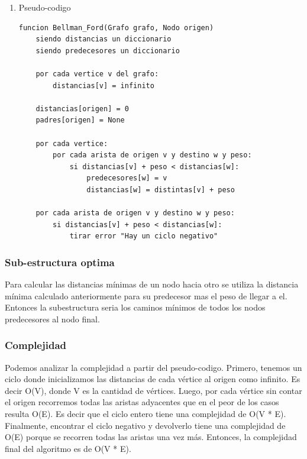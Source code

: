 \documentclass[titlepage,a4paper]{article}
\begin{document}
\pagebreak

\begin{enumerate}
\item Pseudo-codigo
\label{sec:org08232bc}

\begin{verbatim}
funcion Bellman_Ford(Grafo grafo, Nodo origen)
    siendo distancias un diccionario
    siendo predecesores un diccionario

    por cada vertice v del grafo:
        distancias[v] = infinito

    distancias[origen] = 0
    padres[origen] = None

    por cada vertice:
        por cada arista de origen v y destino w y peso:
            si distancias[v] + peso < distancias[w]:
                predecesores[w] = v
                distancias[w] = distintas[v] + peso

    por cada arista de origen v y destino w y peso:
        si distancias[v] + peso < distancias[w]:
            tirar error "Hay un ciclo negativo"
\end{verbatim}
\end{enumerate}

\subsubsection{Sub-estructura optima}
\label{sec:org562f8a9}

Para calcular las distancias mínimas de un nodo hacia otro se utiliza la
distancia mínima calculado anteriormente para su predecesor mas el peso de
llegar a el. Entonces la subestructura seria los caminos mínimos de todos los
nodos predecesores al nodo final.

\subsubsection{Complejidad}
\label{sec:orgdab206f}

Podemos analizar la complejidad a partir del pseudo-codigo. Primero, tenemos un
ciclo donde inicializamos las distancias de cada vértice al origen como
infinito. Es decir O(V), donde V es la cantidad de vértices. Luego, por cada
vértice sin contar el origen recorremos todas las aristas adyacentes que en el
peor de los casos resulta O(E). Es decir que el ciclo entero tiene una
complejidad de O(V * E). Finalmente, encontrar el ciclo negativo y devolverlo
tiene una complejidad de O(E) porque se recorren todas las aristas una vez más.
Entonces, la complejidad final del algoritmo es de O(V * E).
\end{document}
